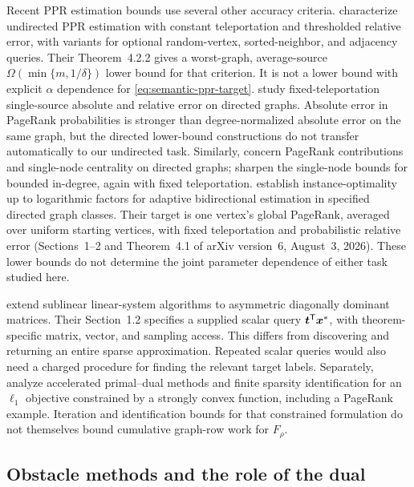 Recent PPR estimation bounds use several other accuracy criteria.
\citet[Section~1 and equation~(2)]{bertram2026undirected} characterize
undirected PPR estimation with constant teleportation and thresholded
relative error, with variants for optional random-vertex, sorted-neighbor,
and adjacency queries. Their Theorem~4.2.2 gives a worst-graph,
average-source $\Omega(\min\{m,1/\delta\})$ lower bound for that
criterion. It is not a lower bound with explicit $\alpha$ dependence for
\cref{eq:semantic-ppr-target}.
\citet[Definitions~1.1--1.2]{jiang2026nearoptimality} study fixed-teleportation
single-source absolute and relative error on directed graphs. Absolute
error in PageRank probabilities is stronger than degree-normalized absolute
error on the same graph, but the directed lower-bound constructions do
not transfer automatically to our undirected task. Similarly,
\citet{wang2024revisiting} concern PageRank contributions and single-node
centrality on directed graphs; \citet{thorup2026pagerank} sharpen the
single-node bounds for bounded in-degree, again with fixed teleportation.
\citet{thorup2026instance} establish instance-optimality up to logarithmic
factors for adaptive bidirectional estimation in specified directed graph
classes. Their target is one vertex's global PageRank, averaged over uniform
starting vertices, with fixed teleportation and probabilistic relative error
(Sections~1--2 and Theorem~4.1 of arXiv version~6, August~3, 2026).
These lower bounds do not determine the joint parameter dependence of
either task studied here.

\citet{kwok2026asymmetric} extend sublinear linear-system algorithms to
asymmetric diagonally dominant matrices. Their Section~1.2 specifies a
supplied scalar query $\bm{t}^{\mathsf{T}}\bm{x}^*$, with theorem-specific matrix,
vector, and sampling access. This differs from discovering and returning
an entire sparse approximation. Repeated scalar queries would also need a
charged procedure for finding the relevant target labels. Separately,
\citet{lin2024constraints} analyze accelerated primal--dual methods and
finite sparsity identification for an $\ell_1$ objective constrained by a
strongly convex function, including a PageRank example. Iteration and
identification bounds for that constrained formulation do not themselves
bound cumulative graph-row work for $F_\rho$.

\subsection{Obstacle methods and the role of the dual}

